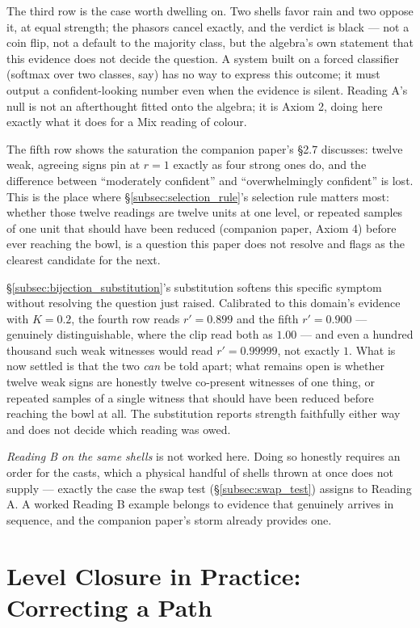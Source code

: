 \documentclass[12pt, a4paper]{article}
\begin{document}
The third row is the case worth dwelling on. Two shells favor rain and
two oppose it, at equal strength; the phasors cancel exactly, and the
verdict is black --- not a coin flip, not a default to the majority
class, but the algebra's own statement that this evidence does not
decide the question. A system built on a forced classifier (softmax
over two classes, say) has no way to express this outcome; it must
output a confident-looking number even when the evidence is silent.
Reading A's null is not an afterthought fitted onto the algebra; it is
Axiom 2, doing here exactly what it does for a Mix reading of colour.

The fifth row shows the saturation the companion paper's \S2.7
discusses: twelve weak, agreeing signs pin at $r=1$ exactly as four
strong ones do, and the difference between ``moderately confident''
and ``overwhelmingly confident'' is lost. This is the place where
\S\ref{subsec:selection_rule}'s selection rule matters most: whether
those twelve readings are twelve units at one level, or repeated
samples of one unit that should have been reduced (companion paper,
Axiom 4) before ever reaching the bowl, is a question this paper does
not resolve and flags as the clearest candidate for the next.

\S\ref{subsec:bijection_substitution}'s substitution softens this
specific symptom without resolving the question just raised.
Calibrated to this domain's evidence with $K=0.2$, the fourth row
reads $r'=0.899$ and the fifth $r'=0.900$ --- genuinely
distinguishable, where the clip read both as $1.00$ --- and even a
hundred thousand such weak witnesses would read $r'=0.99999$, not
exactly $1$. What is now settled is that the two \emph{can} be told
apart; what remains open is whether twelve weak signs are honestly
twelve co-present witnesses of one thing, or repeated samples of a
single witness that should have been reduced before reaching the bowl
at all. The substitution reports strength faithfully either way and
does not decide which reading was owed.

\emph{Reading B on the same shells} is not worked here. Doing so
honestly requires an order for the casts, which a physical handful of
shells thrown at once does not supply --- exactly the case the swap
test (\S\ref{subsec:swap_test}) assigns to Reading A. A worked Reading
B example belongs to evidence that genuinely arrives in sequence, and
the companion paper's storm already provides one.

\section{Level Closure in Practice: Correcting a Path}
\label{sec:level_closure_practice}
\end{document}
